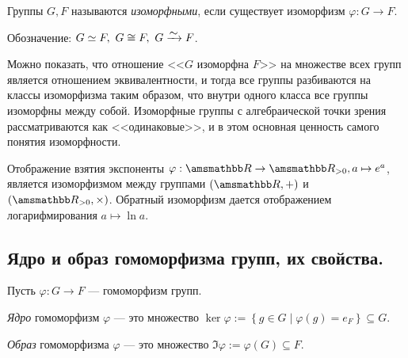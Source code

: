 \begin{definition}
    Группы $G, F$ называются \textit{изоморфными}, если существует изоморфизм
    $\varphi: G \to F$.
\end{definition}
Обозначение: $G \simeq F, \ G \cong F,\ G \MapsTo F$.

Можно показать, что отношение <<$G$ изоморфна $F$>>
на множестве всех групп является отношением эквивалентности,
и тогда все группы разбиваются на классы изоморфизма таким образом,
что внутри одного класса все группы изоморфны между собой.
Изоморфные группы с алгебраической точки зрения рассматриваются как
<<одинаковые>>, и в этом основная ценность самого понятия изоморфности.

\begin{example}
    Отображение взятия экспоненты $\varphi: \RR \to \RR_{>0}, a \mapsto e^a$,
    является изоморфизмом между группами $(\RR, +)$ и $(\RR_{>0}, \times)$.
    Обратный изоморфизм дается отображением логарифмирования $a \mapsto \ln a$.
\end{example}

\subsection{Ядро и образ гомоморфизма групп, их свойства.}

Пусть $\varphi: G \to F$ --- гомоморфизм групп.
\begin{definition}
    \textit{Ядро} гомоморфизм $\varphi$ --- это множество 
    $\ker \varphi := \left\{ g \in G \mid \varphi(g) = e_F \right\} \subseteq G$. \par
    \textit{Образ} гомоморфизма $\varphi$ --- это множество 
    $\Im \varphi := \varphi(G) \subseteq F$.
\end{definition}

